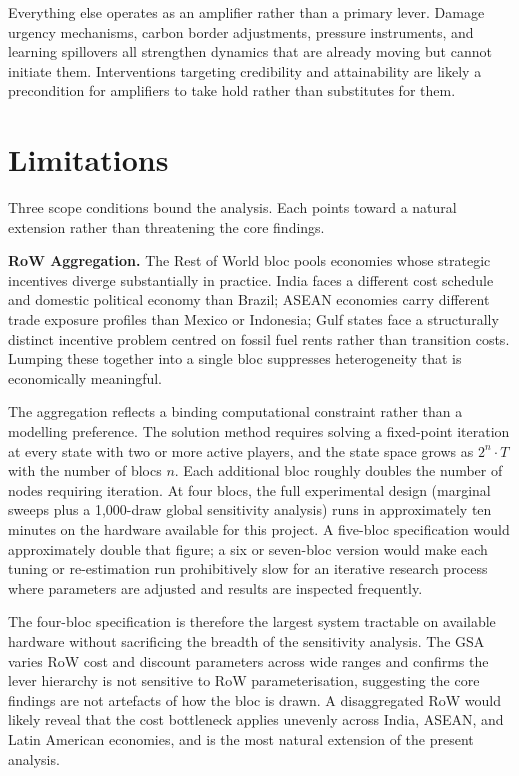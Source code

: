 \documentclass[10pt,a4paper]{article}
\begin{document}
\needspace{4em}
Everything else operates as an amplifier rather than a primary lever. Damage urgency mechanisms, carbon border adjustments, pressure instruments, and learning spillovers all strengthen dynamics that are already moving but cannot initiate them. Interventions targeting credibility and attainability are likely a precondition for amplifiers to take hold rather than substitutes for them.

\clearpage
\needspace{12em}
\section{Limitations}

Three scope conditions bound the analysis. Each points toward a natural extension rather than threatening
the core findings.

\textbf{RoW Aggregation.} The Rest of World bloc pools economies whose strategic incentives diverge
substantially in practice. India faces a different cost schedule and domestic political economy than Brazil;
ASEAN economies carry different trade exposure profiles than Mexico or Indonesia; Gulf states face a
structurally distinct incentive problem centred on fossil fuel rents rather than transition costs. Lumping
these together into a single bloc suppresses heterogeneity that is economically meaningful.

The aggregation reflects a binding computational constraint rather than a modelling preference. The
solution method requires solving a fixed-point iteration at every state with two or more active players,
and the state space grows as $2^n \cdot T$ with the number of blocs $n$. Each additional bloc
roughly doubles the number of nodes requiring iteration. At four blocs, the full experimental design (marginal sweeps plus a 1,000-draw global sensitivity analysis) runs in approximately ten minutes on
the hardware available for this project. A five-bloc specification would approximately double that
figure; a six or seven-bloc version would make each tuning or re-estimation run prohibitively slow for
an iterative research process where parameters are adjusted and results are inspected frequently.

The four-bloc specification is therefore the largest system tractable on available hardware without sacrificing the breadth of the sensitivity analysis. The GSA varies RoW cost and discount parameters across wide ranges and confirms the lever hierarchy is not sensitive to RoW parameterisation, suggesting the core findings are not artefacts of how the bloc is drawn. A disaggregated RoW would likely reveal that the cost bottleneck applies unevenly across India, ASEAN, and Latin American economies, and is the most natural extension of the present analysis.
\end{document}

